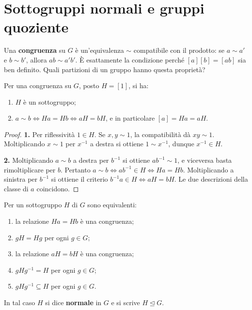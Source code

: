 \section{Sottogruppi normali e gruppi quoziente}
Una \textbf{congruenza} su $G$ è un'equivalenza $\sim$ compatibile con il prodotto: se $a\sim a'$ e $b\sim b'$, allora $ab\sim a'b'$. È esattamente la condizione perché $[a][b]=[ab]$ sia ben definito. Quali partizioni di un gruppo hanno questa proprietà?
\begin{proposizione}
Per una congruenza su $G$, posto $H=[1]$, si ha:
\begin{enumerate}
\item $H$ è un sottogruppo;
\item $a\sim b\iff Ha=Hb\iff aH=bH$, e in particolare $[a]=Ha=aH$.
\end{enumerate}
\end{proposizione}
\begin{proof}
\textbf{1.} Per riflessività $1\in H$. Se $x,y\sim1$, la compatibilità dà $xy\sim1$. Moltiplicando $x\sim1$ per $x^{-1}$ a destra si ottiene $1\sim x^{-1}$, dunque $x^{-1}\in H$.

\textbf{2.} Moltiplicando $a\sim b$ a destra per $b^{-1}$ si ottiene $ab^{-1}\sim1$, e viceversa basta rimoltiplicare per $b$. Pertanto $a\sim b\iff ab^{-1}\in H\iff Ha=Hb$. Moltiplicando a sinistra per $b^{-1}$ si ottiene il criterio $b^{-1}a\in H\iff aH=bH$. Le due descrizioni della classe di $a$ coincidono.
\end{proof}
\begin{teorema}
Per un sottogruppo $H$ di $G$ sono equivalenti:
\begin{enumerate}
\item la relazione $Ha=Hb$ è una congruenza;
\item $gH=Hg$ per ogni $g\in G$;
\item la relazione $aH=bH$ è una congruenza;
\item $gHg^{-1}=H$ per ogni $g\in G$;
\item $gHg^{-1}\subseteq H$ per ogni $g\in G$.
\end{enumerate}
In tal caso $H$ si dice \textbf{normale} in $G$ e si scrive $H\trianglelefteq G$.
\end{teorema}
